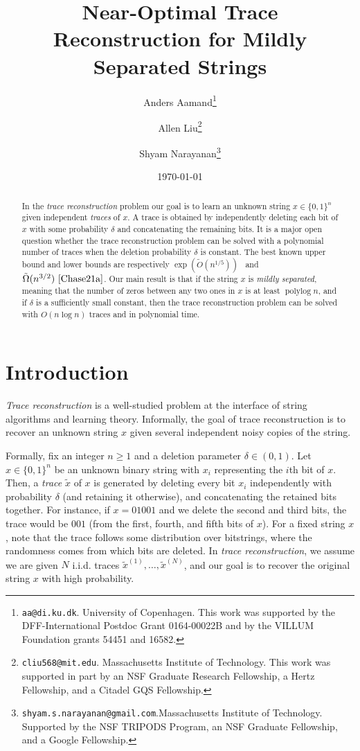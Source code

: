 \documentclass[12pt]{article}
\title{Near-Optimal Trace Reconstruction for Mildly Separated Strings}
\author{Anders Aamand\thanks{\texttt{aa@di.ku.dk}. University of Copenhagen. This work was supported by the DFF-International Postdoc Grant 0164-00022B and by the VILLUM Foundation grants 54451 and 16582.} \and Allen Liu\thanks{\texttt{cliu568@mit.edu}. Massachusetts Institute of Technology. This work was supported in part by an NSF Graduate Research Fellowship, a Hertz Fellowship, and a Citadel GQS Fellowship.} \and Shyam Narayanan\thanks{\texttt{shyam.s.narayanan@gmail.com}.Massachusetts Institute of Technology. Supported by the NSF TRIPODS Program, an NSF Graduate Fellowship, and a Google Fellowship.}}
\date{\today}
\theoremstyle{definition}
\theoremstyle{remark}
\DeclareMathOperator*{\polylog}{polylog}
\begin{document}
\maketitle
\begin{abstract}
    In the \emph{trace reconstruction} problem our goal is to learn an unknown string $x\in \{0,1\}^n$ given independent \emph{traces} of $x$. A trace is obtained by independently deleting each bit of $x$ with some probability $\delta$ and concatenating the remaining bits. It is a major open question whether the trace reconstruction problem can be solved with a polynomial number of traces when the deletion probability $\delta$ is constant. The best known upper bound and lower bounds are respectively $\exp(\tilde O(n^{1/5}))$~\cite{Chase21b} and $\tilde \Omega(n^{3/2})~\cite{Chase21a}$. Our main result is that if the string $x$ is \emph{mildly separated}, meaning that the number of zeros between any two ones in $x$ is at least $\polylog n$, and if $\delta$ is a sufficiently small constant, then the trace reconstruction problem can be solved with $O(n \log n)$ traces and in polynomial time. 
\end{abstract}

\section{Introduction}
\emph{Trace reconstruction} is a well-studied problem at the interface of string algorithms and learning theory. Informally, the goal of trace reconstruction is to recover an unknown string $x$ given several independent noisy copies of the string.

Formally, fix an integer $n \ge 1$ and a deletion parameter $\delta \in (0, 1)$. Let $x \in \{0, 1\}^n$ be an unknown binary string with $x_i$ representing the $i$th bit of $x$. Then, a \emph{trace} $\tilde{x}$ of $x$ is generated by deleting every bit $x_i$ independently with probability $\delta$ (and retaining it otherwise), and concatenating the retained bits together. For instance, if $x = 01001$ and we delete the second and third bits, the trace would be $001$ (from the first, fourth, and fifth bits of $x$).
For a fixed string $x$, note that the trace follows some distribution over bitstrings, where the randomness comes from which bits are deleted.
In \emph{trace reconstruction}, we assume we are given $N$ i.i.d. traces $\tilde{x}^{(1)}, \dots, \tilde{x}^{(N)}$, and our goal is to recover the
original string $x$ with high probability.
\end{document}

